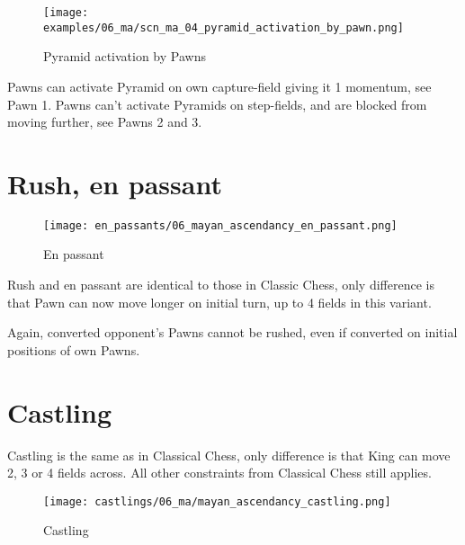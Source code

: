 \noindent
\begin{figure}[!h]
\texttt{[image: examples/06\_ma/scn\_ma\_04\_pyramid\_activation\_by\_pawn.png]}
\caption{Pyramid activation by Pawns}
\label{fig:scn_ma_04_pyramid_activation_by_pawn}
\end{figure}

Pawns can activate Pyramid on own capture-field giving it 1 momentum, see Pawn 1.
Pawns can't activate Pyramids on step-fields, and are blocked from moving further,
see Pawns 2 and 3.

\clearpage %

\section*{Rush, en passant}
\label{sec:Mayan Ascendancy/Rush, en passant}

\noindent
\begin{wrapfigure}{l}{0.4\textwidth}
\centering
\texttt{[image: en\_passants/06\_mayan\_ascendancy\_en\_passant.png]}
\caption{En passant}
\label{fig:06_mayan_ascendancy_en_passant}
\end{wrapfigure}
Rush and en passant are identical to those in Classic Chess, only difference
is that Pawn can now move longer on initial turn, up to 4 fields in this
variant.

Again, converted opponent's Pawns cannot be rushed, even if converted on
initial positions of own Pawns.

\clearpage %

\section*{Castling}
\label{sec:Mayan Ascendancy/Castling}

Castling is the same as in Classical Chess, only difference is that King can move 2, 3 or 4 fields across.
All other constraints from Classical Chess still applies.

\noindent
\begin{figure}[!h]
\texttt{[image: castlings/06\_ma/mayan\_ascendancy\_castling.png]}
\caption{Castling}
\label{fig:mayan_ascendancy_castling}
\end{figure}

